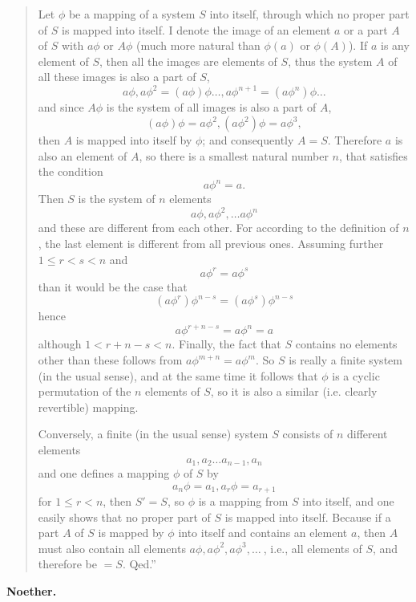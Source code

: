 \documentclass[leqno,hidelinks]{article}
\theoremstyle{definition}
\begin{document}
\begin{paracol}{2}
\begin{quote}
\hspace{12pt} Let $\phi$ be a mapping of a system $S$ into itself, through which
no proper part of $S$ is mapped into itself. I denote the image of an element $a$
or a part $A$ of $S$ with $a\phi$ or $A\phi$ (much more natural than $\phi(a)$
or $\phi(A)$). If $a$ is any element of $S$, then all the images are elements of
$S$, thus the system $A$ of all these images is also a part of $S$,
\vspace{16pt}
\[
	a\phi, a\phi^2= (a\phi)\phi \ldots, a\phi^{n+1} = (a\phi^n)\phi \ldots
\]
and since $A\phi$ is the system of all images is also a part of $A$,
\[
	(a\phi) \phi = a\phi^2, (a\phi^2)\phi = a\phi^3,
\]
then $A$ is mapped into itself by $\phi$; and consequently $A = S$. Therefore $a$
is also an element of $A$, so there is a smallest natural number $n$, that
satisfies the condition
\[
	a\phi^n = a.
\]
Then $S$ is the system of $n$ elements
\[
	a\phi,a\phi^2,\ldots a\phi^n
\]
and these are different from each other.
For according to the definition of $n$, the last element is different from all
previous ones. Assuming further $1 \leq r<s < n$ and
\[
	a\phi^r = a\phi^s
\]
than it would be the case that
\[
	(a\phi^r)\phi^{n-s} = (a\phi^s) \phi^{n-s}
\]
hence
\[
	a\phi^{r+n-s} = a\phi^n=a
\]
although $1<r+n-s<n$.
Finally, the fact that $S$ contains no elements other than these follows from
$a\phi^{m + n} = a\phi^m$. So $S$ is really a finite system (in the usual sense),
and at the same time it follows that $\phi$ is a cyclic permutation of the $n$
elements of $S$, so it is also a similar (i.e. clearly revertible) mapping.

\hspace{12pt} Conversely, a finite (in the usual sense) system $S$ consists of
$n$ different elements
\[
	a_1, a_2 \ldots a_{n-1}, a_n
\]
and one defines a mapping $\phi$ of $S$ by
\[
a_n\phi = a_1, a_r\phi=a_{r+1}
\]
for $1\leq r<n$, then $S' = S$, so $\phi$ is a mapping from $S$ into itself, and
one easily shows that no proper part of $S$ is mapped into itself. Because if
a part $A$ of $S$ is mapped by $\phi$ into itself and contains an element $a$,
then $A$ must also contain all elements $a\phi, a\phi^2, a\phi^3, \ldots \ $, i.e.,
all elements of $S$, and therefore be $= S$. Qed.''
\end{quote}

\begin{flushright}\textbf{Noether.}\end{flushright}

\end{paracol}
\end{document}
